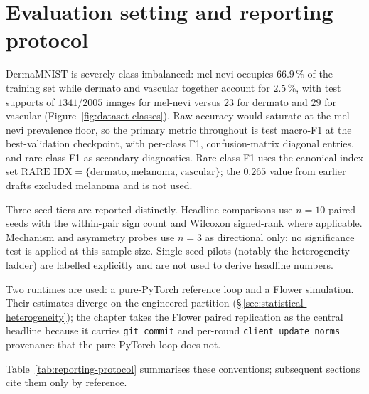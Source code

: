 
\section{Evaluation setting and reporting protocol}
\label{sec:eval-setting}

DermaMNIST is severely class-imbalanced: mel-nevi occupies $66.9\,\%$ of
the training set while dermato and vascular together account for $2.5\,\%$,
with test supports of $1341/2005$ images for mel-nevi versus $23$ for
dermato and $29$ for vascular (Figure~\ref{fig:dataset-classes}). Raw
accuracy would saturate at the mel-nevi prevalence floor, so the primary
metric throughout is test macro-F1 at the best-validation checkpoint, with
per-class F1, confusion-matrix diagonal entries, and rare-class F1 as
secondary diagnostics. Rare-class F1 uses the canonical index set
$\mathrm{RARE\_IDX} = \{\text{dermato}, \text{melanoma}, \text{vascular}\}$;
the $0.265$ value from earlier drafts excluded melanoma and is not used.

Three seed tiers are reported distinctly. Headline comparisons use $n = 10$
paired seeds with the within-pair sign count and Wilcoxon signed-rank where
applicable. Mechanism and asymmetry probes use $n = 3$ as directional only;
no significance test is applied at this sample size. Single-seed pilots
(notably the heterogeneity ladder) are labelled explicitly and are not used
to derive headline numbers.

Two runtimes are used: a pure-PyTorch reference loop and a Flower
simulation. Their estimates diverge on the engineered partition
(\S\,\ref{sec:statistical-heterogeneity}); the chapter takes the Flower
paired replication as the central headline because it carries
\texttt{git\_commit} and per-round \texttt{client\_update\_norms} provenance
that the pure-PyTorch loop does not.

Table~\ref{tab:reporting-protocol} summarises these conventions; subsequent
sections cite them only by reference.



